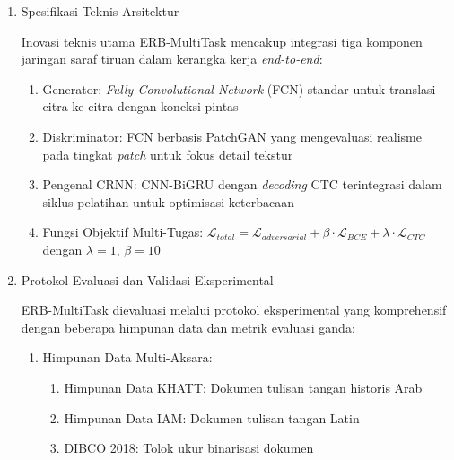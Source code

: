 \documentclass[12pt,a4paper]{article}
\begin{document}
\begin{enumerate}[leftmargin=*, labelindent=0pt, itemsep=1ex, topsep=0pt]
\begin{enumerate}[leftmargin=1.5em, labelsep=0.5em, itemindent=0pt, noitemsep, topsep=0pt, label=\alph*.]
      \item Dukungan Multi-Aksara \mbox{}\\[0.1em]
            Demonstrasi efektivitas pada aksara Arab (basis data KHATT) dan aksara Latin (basis data IAM), menunjukkan fleksibilitas lintas bahasa.
\end{enumerate}

\item Spesifikasi Teknis Arsitektur
\label{para:erb-spesifikasi}

Inovasi teknis utama ERB-MultiTask mencakup integrasi tiga komponen jaringan saraf tiruan dalam kerangka kerja \textit{end-to-end}:

\begin{enumerate}[leftmargin=1.5em, labelsep=0.5em, itemindent=0pt, noitemsep, topsep=0pt, label=\alph*.]
      \item Generator: \textit{Fully Convolutional Network} (FCN) standar untuk translasi citra-ke-citra dengan koneksi pintas
      \item Diskriminator: FCN berbasis PatchGAN yang mengevaluasi realisme pada tingkat \textit{patch} untuk fokus detail tekstur
      \item Pengenal CRNN: CNN-BiGRU dengan \textit{decoding} CTC terintegrasi dalam siklus pelatihan untuk optimisasi keterbacaan
      \item Fungsi Objektif Multi-Tugas: $\mathcal{L}_{total} = \mathcal{L}_{adversarial} + \beta \cdot \mathcal{L}_{BCE} + \lambda \cdot \mathcal{L}_{CTC}$ dengan $\lambda = 1$, $\beta = 10$
\end{enumerate}

\item Protokol Evaluasi dan Validasi Eksperimental
\label{para:erb-evaluasi}

ERB-MultiTask dievaluasi melalui protokol eksperimental yang komprehensif dengan beberapa himpunan data dan metrik evaluasi ganda:

\begin{enumerate}[leftmargin=1.5em, labelsep=0.5em, itemindent=0pt, label=\arabic*., topsep=0pt, parsep=0pt, itemsep=0.5em]
      \item Himpunan Data Multi-Aksara:
            \begin{enumerate}[leftmargin=1.5em, labelsep=0.5em, itemindent=0pt, noitemsep, topsep=0pt, label=\alph*.]
                  \item Himpunan Data KHATT: Dokumen tulisan tangan historis Arab
                  \item Himpunan Data IAM: Dokumen tulisan tangan Latin
                  \item DIBCO 2018: Tolok ukur binarisasi dokumen
            \end{enumerate}


\end{enumerate}
\end{enumerate}
\end{document}

